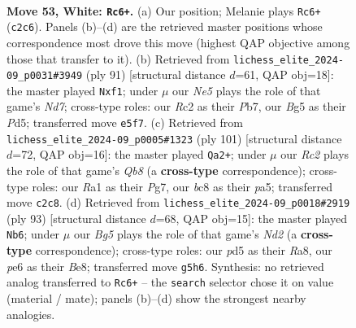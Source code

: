 \documentclass[11pt]{article}
\begin{document}
\clearpage

\begin{figure}[p]\centering
\begin{subfigure}{0.46\textwidth}\centering
\resizebox{\linewidth}{!}{%
\newchessgame
\chessboard[
  setfen={1qb5/r7/3kp3/p2pNpBQ/P6P/8/2R5/RN4K1 w - - 1 53},
  showmover=false,
  pgfstyle=straightmove, color=movearrow, markmove={c2-c6}
]}
\caption{}
\end{subfigure}\hfill
\begin{subfigure}{0.46\textwidth}\centering
\resizebox{\linewidth}{!}{%
\newchessgame
\chessboard[
  setfen={8/1p5k/6p1/q2p1p2/3P4/4P2P/3nQ1P1/5RBK b - - 3 46},
  showmover=false,
  pgfstyle=straightmove, color=movearrow, markmove={d2-f1}
]}
\caption{}
\end{subfigure}
\\[4pt]
\begin{subfigure}{0.46\textwidth}\centering
\resizebox{\linewidth}{!}{%
\newchessgame
\chessboard[
  setfen={8/3p1ppk/p7/P1Bb3p/K2Pp2P/2QnP3/8/1q6 b - - 4 51},
  showmover=false,
  pgfstyle=straightmove, color=movearrow, markmove={b1-a2}
]}
\caption{}
\end{subfigure}\hfill
\begin{subfigure}{0.46\textwidth}\centering
\resizebox{\linewidth}{!}{%
\newchessgame
\chessboard[
  setfen={r3b1k1/1q1n1pp1/7p/1p1R4/1P1QP1P1/5P2/5K1P/1B6 b - - 2 47},
  showmover=false,
  pgfstyle=straightmove, color=movearrow, markmove={d7-b6}
]}
\caption{}
\end{subfigure}
\caption{\textbf{Move 53, White: \texttt{Rc6+}.} (a) Our position; Melanie plays \texttt{Rc6+} (\texttt{c2c6}). Panels (b)--(d) are the retrieved master positions whose correspondence most drove this move (highest QAP objective among those that transfer to it). (b) Retrieved from \texttt{lichess\_elite\_2024-09\_p0031\#3949} (ply 91) [structural distance $d$=61, QAP obj=18]: the master played \texttt{Nxf1}; under $\mu$ our \emph{Ne5} plays the role of that game's \emph{Nd7}; cross-type roles: our \emph{R}c2 as their \emph{P}b7, our \emph{B}g5 as their \emph{P}d5; transferred move \texttt{e5f7}. (c) Retrieved from \texttt{lichess\_elite\_2024-09\_p0005\#1323} (ply 101) [structural distance $d$=72, QAP obj=16]: the master played \texttt{Qa2+}; under $\mu$ our \emph{Rc2} plays the role of that game's \emph{Qb8} (a \textbf{cross-type} correspondence); cross-type roles: our \emph{R}a1 as their \emph{P}g7, our \emph{b}c8 as their \emph{p}a5; transferred move \texttt{c2c8}. (d) Retrieved from \texttt{lichess\_elite\_2024-09\_p0018\#2919} (ply 93) [structural distance $d$=68, QAP obj=15]: the master played \texttt{Nb6}; under $\mu$ our \emph{Bg5} plays the role of that game's \emph{Nd2} (a \textbf{cross-type} correspondence); cross-type roles: our \emph{p}d5 as their \emph{R}a8, our \emph{p}e6 as their \emph{B}e8; transferred move \texttt{g5h6}. Synthesis: no retrieved analog transferred to \texttt{Rc6+} -- the \texttt{search} selector chose it on value (material / mate); panels (b)--(d) show the strongest nearby analogies.}
\label{fig:thought-m104}
\end{figure}
\end{document}
